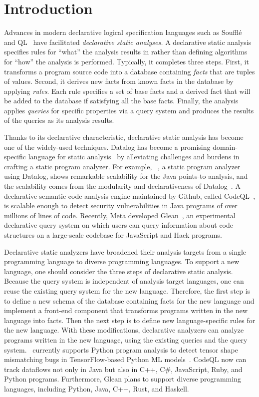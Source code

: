 \section{Introduction}
Advances in modern declarative logical specification languages such as
Souffl\'{e}~\cite{souffle} and QL~\cite{ql2016} have facilitated
\emph{declarative static analyses.} A declarative static analysis specifies
rules for ``what'' the analysis results in rather than defining algorithms for
``how'' the analysis is performed.  Typically, it completes three steps.
First, it transforms a program source code into a database containing
\textit{facts} that are tuples of values.  Second, it derives new facts from
known facts in the database by applying {\it rules}.  Each rule specifies a set
of base facts and a derived fact that will be added to the database if
satisfying all the base facts.  Finally, the analysis applies {\it queries} for
specific properties via a query system and produces the results of the queries
as its analysis results.

Thanks to its declarative characteristic, declarative static analysis has
become one of the widely-used techniques.  Datalog has become a promising
domain-specific language for static analysis~\cite{doop, allen2015D,
allen2015stagedD, alpuente2010D, dawson1996D, naik2006D, reps1994D,
smaragdakis2014D, whaley2005D, scholz2016} by alleviating challenges and
burdens in crafting a static program analyzer.  For example, \doop~\cite{doop},
a static program analyzer using Datalog, shows remarkable scalability for the
Java points-to analysis, and the scalability comes from the modularity and
declarativeness of Datalog~\cite{doopWorkshop}.  A declarative semantic code
analysis engine maintained by Github, called CodeQL~\cite{codeql}, is scalable
enough to detect security vulnerabilities in Java programs of over millions of
lines of code.  Recently, Meta developed Glean~\cite{glean}, an experimental
declarative query system on which users can query information about code
structures on a large-scale codebase for JavaScript and Hack programs.

Declarative static analyzers have broadened their analysis targets from a
single programming language to diverse programming languages.  To support a new
language, one should consider the three steps of declarative static analysis.
Because the query system is independent of analysis target languages, one can
reuse the existing query system for the new language. Therefore, the first step
is to define a new schema of the database containing facts for the new language
and implement a front-end component that transforms programs written in the new
language into facts.  Then the next step is to define new language-specific
rules for the new language.  With these modifications, declarative analyzers
can analyze programs written in the new language, using the existing queries
and the query system.  \doop~currently supports Python program analysis to
detect tensor shape mismatching bugs in TensorFlow-based Python ML
models~\cite{lagouvardos2020static}.  CodeQL now can track dataflows not only
in Java but also in C++, C\#, JavaScript, Ruby, and Python programs.
Furthermore, Glean plans to support diverse programming languages, including
Python, Java, C++, Rust, and Haskell.

